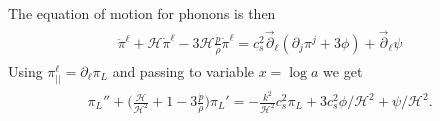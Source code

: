 The equation of motion for phonons is then
{\small\begin{align}
\begin{aligned}
    \ddot{\pi}^\ell +\mathcal{H}\dot{\pi}^\ell -3\mathcal{H}\tfrac{\dot{p}}{\dot{\rho}}\dot{\pi}^\ell
    = c_s^2 \vec{\partial}_\ell(\partial_j \pi^j+3\phi) +\vec{\partial}_\ell\psi 
\end{aligned}\end{align}}
Using $\pi^\ell_{||}=\partial_\ell \pi_L$ and passing to variable $x=\log a$ we get
{\small\begin{align}\label{eq:eom_phonon_potential_log_a}
\begin{aligned}
    \pi_L''+\Big(\frac{\dot{\mathcal{H}}}{\mathcal{H}^2}+1-3\tfrac{\dot{p}}{\dot{\rho}}\Big)\pi_L'= -\frac{k^2}{\mathcal{H}^2}c_s^2\pi_L+3c_s^2\phi/\mathcal{H}^2 +\psi/\mathcal{H}^2. 
\end{aligned}\end{align}}

